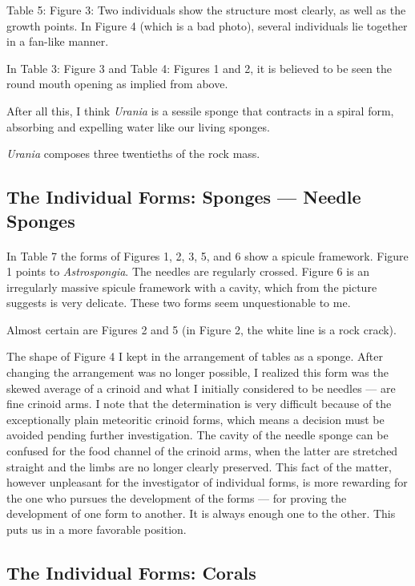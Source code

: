 \documentclass[a4paper, 12pt, oneside]{article}
\begin{document}
Table 5: Figure 3: Two individuals show the structure most clearly, as well as the growth points. In Figure 4 (which is a bad photo), several individuals lie together in a fan-like manner.

In Table 3: Figure 3 and Table 4: Figures 1 and 2, it is believed to be seen the round mouth opening as implied from above.

After all this, I think \emph{Urania} is a sessile sponge that contracts in a spiral form, absorbing and expelling water like our living sponges.

\emph{Urania} composes three twentieths of the rock mass.
\clearpage
\subsection{The Individual Forms: Sponges --- Needle Sponges}
\paragraph*{}
In Table 7 the forms of Figures 1, 2, 3, 5, and 6 show a spicule framework. Figure 1 points to \emph{Astrospongia}. The needles are regularly crossed. Figure 6 is an irregularly massive spicule framework with a cavity, which from the picture suggests is very delicate. These two forms seem unquestionable to me.

Almost certain are Figures 2 and 5 (in Figure 2, the white line is a rock crack).

The shape of Figure 4 I kept in the arrangement of tables as a sponge. After changing the arrangement was no longer possible, I realized this form was the skewed average of a crinoid and what I initially considered to be needles --- are fine crinoid arms. I note that the determination is very difficult because of the exceptionally plain meteoritic crinoid forms, which means a decision must be avoided pending further investigation. The cavity of the needle sponge can be confused for the food channel of the crinoid arms, when the latter are stretched straight and the limbs are no longer clearly preserved. This fact of the matter, however unpleasant for the investigator of individual forms, is more rewarding for the one who pursues the development of the forms --- for proving the development of one form to another. It is always enough one to the other. This puts us in a more favorable position.
\clearpage
\subsection{The Individual Forms: Corals}
\end{document}
